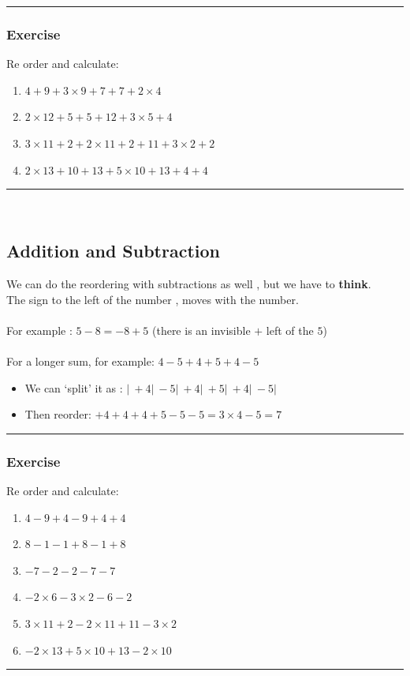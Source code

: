 \documentclass[a4paper,12pt]{article}
\newcommand\question{
	 \rule[0pt]{17cm}{0.5pt}\vspace{-0.5cm}
	\subsubsection{Exercise}

}
\newcommand\questionend{
	\rule[0pt]{17cm}{0.5pt}\vspace{0.0cm}\\
}
\begin{document}
\newpage
\question
Re order and calculate:
\begin{multicols}{2}
	\begin{enumerate}[label=\normalsize \alph*)~~~ , topsep=8pt,itemsep=5pt,partopsep=4pt, parsep=4pt]
		\item $4+9+3 \times 9 +7+7+2 \times4$
		\item $2 \times 12 + 5 + 5 + 12 + 3 \times 5  +4$
		\item $3\times 11 +2+ 2\times11 +2 + 11 +3 \times 2 +2$
		\item $2 \times 13 + 10 +  13 + 5 \times 10 + 13 + 4 +4$
	\end{enumerate}
\end{multicols}\vspace{0.2cm}
\questionend
\subsection{Addition and Subtraction}
We can do the reordering with subtractions as well , but we have to \textbf{think}.\\
The sign to the left of the number , moves with the number.\\\\
For example : $5 - 8 = -8 +5 $  (there is an invisible $+$ left of the $5$)\\\\
For a longer sum, for example: $4 -5+4+5 +4 -5$
\begin{itemize}
	\item We can `split' it as : $|~+4|~ -5|~+4|~+5|~ +4|~ -5|$
	\item Then reorder: $+4 + 4 + 4 +5 -5 -5 = 3\times 4 -5 = 7$
\end{itemize}
\question
Re order and calculate:
\begin{multicols}{2}
	\begin{enumerate}[label=\normalsize \alph*)~~~ , topsep=8pt,itemsep=5pt,partopsep=4pt, parsep=4pt]
		\item $4-9 +4-9+4 + 4$
		\item $8 -1 -1 +8 -1+8 $
		\item $-7 -2 -2 -7 -7$
		\item $-2 \times 6 - 3 \times 2  -6  -2$
		\item $3\times 11 +2-2\times11 +11 -3 \times 2 $
		\item $-2 \times 13 + 5 \times 10 + 13 -2\times 10$
	\end{enumerate}
\end{multicols}\vspace{0.2cm}
\questionend
\newpage
\end{document}
